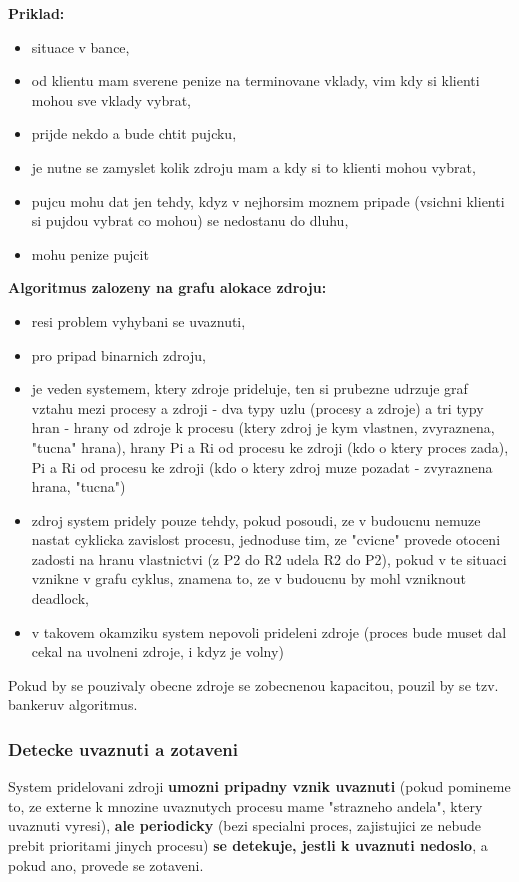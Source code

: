 \documentclass[a4paper, 11pt]{article}
\begin{document}
\textbf{Priklad:}
\begin{itemize}
    \item situace v bance,
    \item od klientu mam sverene penize na terminovane vklady, vim kdy si klienti mohou sve vklady vybrat,
    \item prijde nekdo a bude chtit pujcku,
    \item je nutne se zamyslet kolik zdroju mam a kdy si to klienti mohou vybrat,
    \item pujcu mohu dat jen tehdy, kdyz v nejhorsim moznem pripade (vsichni klienti si pujdou vybrat co mohou) se nedostanu do dluhu,
    \item mohu penize pujcit \\
\end{itemize}

\textbf{Algoritmus zalozeny na grafu alokace zdroju:}
\begin{itemize}
    \item resi problem vyhybani se uvaznuti,
    \item pro pripad binarnich zdroju,
    \item je veden systemem, ktery zdroje prideluje, ten si prubezne udrzuje graf vztahu mezi procesy a zdroji - dva typy uzlu (procesy a zdroje) a tri typy hran - hrany od zdroje k procesu (ktery zdroj je kym vlastnen, zvyraznena, "tucna" hrana), hrany Pi a Ri od procesu ke zdroji (kdo o ktery proces zada), Pi a Ri od procesu ke zdroji (kdo o ktery zdroj muze pozadat - zvyraznena hrana, "tucna")
    \item zdroj system pridely pouze tehdy, pokud posoudi, ze v budoucnu nemuze nastat cyklicka zavislost procesu, jednoduse tim, ze "cvicne" provede otoceni zadosti na hranu vlastnictvi (z P2 do R2 udela R2 do P2), pokud v te situaci vznikne v grafu cyklus, znamena to, ze v budoucnu by mohl vzniknout deadlock,
    \item v takovem okamziku system nepovoli prideleni zdroje (proces bude muset dal cekal na uvolneni zdroje, i kdyz je volny) \\
\end{itemize}

Pokud by se pouzivaly obecne zdroje se zobecnenou kapacitou, pouzil by se tzv. bankeruv algoritmus. \\

\subsubsection{Detecke uvaznuti a zotaveni}
System pridelovani zdroji \textbf{umozni pripadny vznik uvaznuti} (pokud pomineme to, ze externe k mnozine uvaznutych procesu mame "strazneho andela", ktery uvaznuti vyresi), \textbf{ale periodicky} (bezi specialni proces, zajistujici ze nebude prebit prioritami jinych procesu) \textbf{se detekuje, jestli k uvaznuti nedoslo}, a pokud ano, provede se zotaveni.
\end{document}
